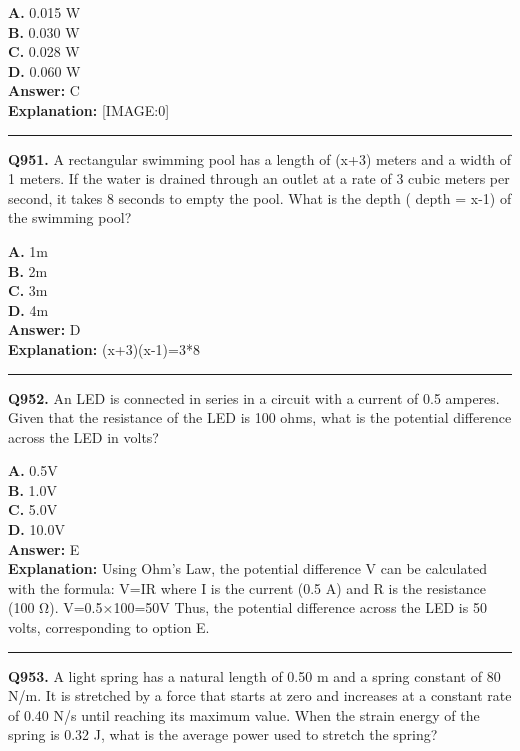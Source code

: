 \documentclass[12pt]{article}
\begin{document}
\textbf{A.} 0.015 W \\
\textbf{B.} 0.030 W \\
\textbf{C.} 0.028 W \\
\textbf{D.} 0.060 W \\

\textbf{Answer:} C \\
\textbf{Explanation:} [IMAGE:0]

\hrule
\vspace{1em}


\noindent
\textbf{Q951.} A rectangular swimming pool has a length of (x+3) meters and a width of
1
meters. If the water is drained through an outlet at a rate of 3 cubic meters per second, it takes
8
seconds to empty the pool. What is the depth
(
depth
= x-1)
of the swimming pool?



\textbf{A.} 1m \\
\textbf{B.} 2m \\
\textbf{C.} 3m \\
\textbf{D.} 4m \\

\textbf{Answer:} D \\
\textbf{Explanation:} (x+3)(x-1)=3*8

\hrule
\vspace{1em}


\noindent
\textbf{Q952.} An LED is connected in series in a circuit with a current of 0.5 amperes. Given that the resistance of the LED is 100 ohms, what is the potential difference across the LED in volts?



\textbf{A.} 0.5V \\
\textbf{B.} 1.0V \\
\textbf{C.} 5.0V \\
\textbf{D.} 10.0V \\

\textbf{Answer:} E \\
\textbf{Explanation:} Using Ohm's Law, the potential difference V can be calculated with the formula: V=IR
where I is the current (0.5 A) and R is the resistance (100 Ω). V=0.5×100=50V
Thus, the potential difference across the LED is 50 volts, corresponding to option E.

\hrule
\vspace{1em}


\noindent
\textbf{Q953.} A light spring has a natural length of 0.50 m and a spring constant of 80 N/m. It is stretched by a force that starts at zero and increases at a constant rate of 0.40 N/s until reaching its maximum value. When the strain energy of the spring is 0.32 J, what is the average power used to stretch the spring?
\end{document}
